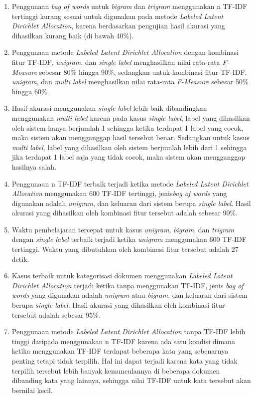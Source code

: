 \begin{enumerate}[nolistsep,leftmargin=0.5cm]
\item
Penggunaan {\itshape bag of words} untuk {\itshape bigram} dan {\itshape trigram} menggunakan n TF-IDF tertinggi kurang sesuai untuk digunakan pada metode {\itshape Labeled Latent Dirichlet Allocation}, karena berdasarkan pengujian hasil akurasi yang dihasilkan kurang baik (di bawah 40\%).
\item
Penggunaan metode {\itshape Labeled Latent Dirichlet Allocation} dengan kombinasi fitur TF-IDF, {\itshape unigram}, dan {\itshape single label} menghasilkan nilai rata-rata {\itshape F-Measure} sebesar 80\% hingga 90\%, sedangkan untuk kombinasi fitur TF-IDF, {\itshape unigram}, dan {\itshape multi label} menghasilkan nilai rata-rata {\itshape F-Measure} sebesar 50\% hingga 60\%.
\item
Hasil akurasi menggunakan {\itshape single label} lebih baik dibandingkan menggunakan {\itshape multi label} karena pada kasus {\itshape single label}, label yang dihasilkan oleh sistem hanya berjumlah 1 sehingga ketika terdapat 1 label yang cocok, maka sistem akan mengganggap hasil tersebut benar. Sedangkan untuk kasus {\itshape multi label}, label yang dihasilkan oleh sistem berjumlah lebih dari 1 sehingga jika terdapat 1 label saja yang tidak cocok, maka sistem akan mengganggap hasilnya salah.
\item
Penggunaan n TF-IDF terbaik terjadi ketika metode {\itshape Labeled Latent Dirichlet Allocation} menggunakan 600 TF-IDF tertinggi, jenis{\itshape bag of words} yang digunakan adalah {\itshape unigram}, dan keluaran dari sistem berupa {\itshape single label}. Hasil akurasi yang dihasilkan oleh kombinasi fitur tersebut adalah sebesar 90\%.
\item
Waktu pembelajaran tercepat untuk kasus {\itshape unigram}, {\itshape bigram}, dan {\itshape trigram} dengan {\itshape single label} terbaik terjadi ketika {\itshape unigram} menggunakan 600 TF-IDF tertinggi. Waktu yang dibutuhkan oleh kombinasi fitur tersebut adalah 27 detik.
\item
Kasus terbaik untuk kategorisasi dokumen menggunakan {\itshape Labeled Latent Dirichlet Allocation} terjadi ketika tanpa menggunakan TF-IDF, jenis {\itshape bag of words} yang digunakan adalah {\itshape unigram} atau {\itshape bigram}, dan keluaran dari sistem berupa {\itshape single label}. Hasil akurasi yang dihasilkan oleh kombinasi fitur tersebut adalah sebesar 95\%.
\item
Penggunaan metode {\itshape Labeled Latent Dirichlet Allocation} tanpa TF-IDF lebih tinggi daripada menggunakan n TF-IDF karena ada satu kondisi dimana ketika menggunakan TF-IDF terdapat beberapa kata yang sebenarnya penting tetapi tidak terpilih. Hal ini dapat terjadi karena kata yang tidak terpilih tersebut lebih banyak kemunculannya di beberapa dokumen dibanding kata yang lainnya, sehingga nilai TF-IDF untuk kata tersebut akan bernilai kecil.

\end{enumerate}

